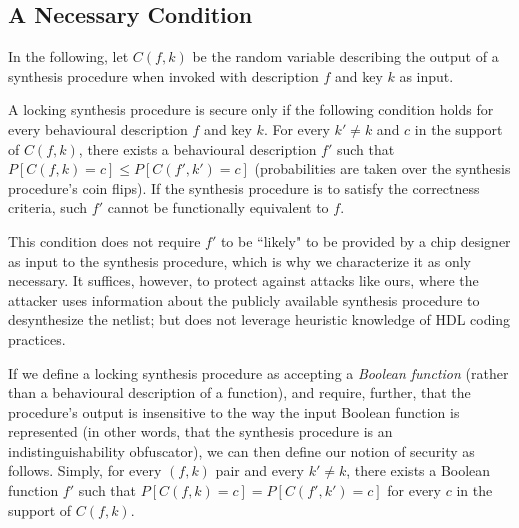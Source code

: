 
\subsection{A Necessary Condition}


In the following, let $C(f,k)$ be the random variable describing the output of a synthesis procedure when invoked with description $f$ and key $k$ as input.
\begin{definition}
A locking synthesis procedure is secure only if the following condition holds for every behavioural description $f$ and key $k$. For every $k'\neq k$ and $c$ in the support of $C(f,k)$, there exists a behavioural description $f'$ such that
$P[C(f,k)=c]\leq P[C(f',k')=c]$
(probabilities are taken over the synthesis procedure's coin flips). If the synthesis procedure is to satisfy the correctness criteria, such $f'$ cannot be functionally equivalent to $f$.

\end{definition}

This condition does not require $f'$ to be ``likely" to be provided by a chip designer as input to the synthesis procedure, which is why we characterize it as only necessary. It suffices, however, to protect against attacks like ours, where the attacker uses information about the publicly available synthesis procedure to desynthesize the netlist; but does not leverage heuristic knowledge of HDL coding practices.

\begin{definition}
If we define a locking synthesis procedure as accepting a \emph{Boolean function} (rather than a behavioural description of a function), and require, further, that the procedure's output is insensitive to the way the input Boolean function is represented (in other words, that the synthesis procedure is an indistinguishability obfuscator), we can then define our notion of security as follows. Simply, for every $(f,k)$ pair and every $k'\neq k$, there exists a Boolean function $f'$ such that $P[C(f,k)=c]=P[C(f',k')=c]$ for every $c$ in the support of $C(f,k)$.
\end{definition}

